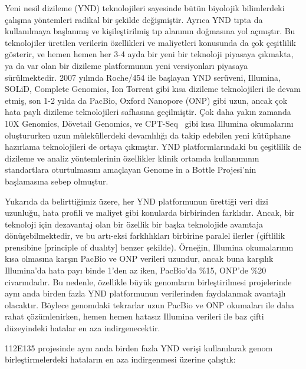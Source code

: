 \documentclass[11pt]{article}
\begin{document}
\noindent
Yeni nesil dizileme (YND) teknolojileri sayesinde bütün biyolojik bilimlerdeki çalışma yöntemleri radikal bir şekilde değişmiştir. Ayrıca YND tıpta da kullanılmaya başlanmış ve kişileştirilmiş tıp alanının doğmasına yol açmıştır. Bu teknolojiler üretilen verilerin özellikleri ve maliyetleri konusunda da çok çeşitlilik gösterir, ve hemen hemen her 3-4 ayda bir yeni bir teknoloji piyasaya çıkmakta, ya da var olan bir dizileme platformunun yeni versiyonları piyasaya sürülmektedir. 2007 yılında Roche/454 ile başlayan YND serüveni, Illumina, SOLiD, Complete Genomics, Ion Torrent gibi kısa dizileme teknolojileri ile devam etmiş, son 1-2 yılda da PacBio, Oxford Nanopore (ONP) gibi uzun, ancak çok hata paylı dizileme teknolojileri safhasına geçilmiştir. Çok daha yakın zamanda 10X Genomics, Dövetail Genomics, ve CPT-Seq~\cite{Adey2014,Amini2014} gibi kısa Illumina okumalarını oluştururken uzun müleküllerdeki devamlılığı da takip edebilen yeni kütüphane hazırlama teknolojileri de ortaya çıkmıştır. YND platformlarındaki bu çeşitlilik de dizileme ve analiz yöntemlerinin özellikler klinik ortamda kullanımının standartlara oturtulmasını amaçlayan Genome in a Bottle Projesi'nin~\cite{Zook2014} başlamasına sebep olmuştur.

Yukarıda da belirttiğimiz üzere, her YND platformunun ürettiği veri dizi uzunluğu, hata profili ve maliyet gibi konularda birbirinden farklıdır. Ancak, bir teknoloji için dezavantaj olan bir özellik bir başka teknolojide avamtaja dönüşebilmektedir, ve bu artı-eksi farklılıkları birbirine paralel ilerler (çiftlilik prensibine [principle of dualıty] benzer şekilde). Örneğin, Illumina okumalarının kısa olmasına karşın PacBio ve ONP verileri uzundur, ancak buna karşılık Illumina'da hata payı binde 1'den az iken, PacBio'da \%15, ONP'de \%20 civarındadır. Bu nedenle, özellikle büyük genomların birleştirilmesi projelerinde aynı anda birden fazla YND platformunun verilerinden faydalanmak avantajlı olacaktır. Böylece genomdaki tekrarlar uzun PacBio ve ONP okumaları ile daha rahat çözümlenirken, hemen hemen hatasız Illumina verileri ile baz çifti düzeyindeki hatalar en aza indirgenecektir.

112E135 projesinde aynı anda birden fazla YND verişi kullanılarak genom birleştirmelerdeki hataların en aza indirgenmesi üzerine çalıştık:
\end{document}
